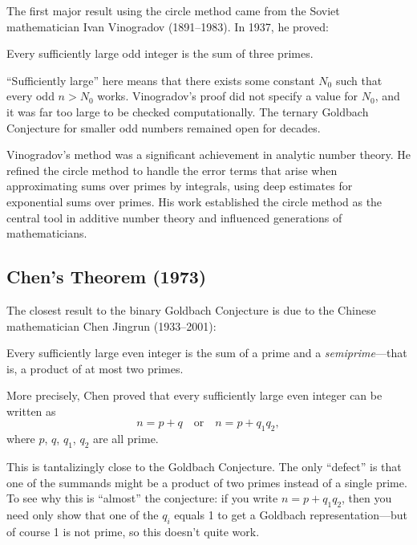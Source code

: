 The first major result using the circle method came from the Soviet mathematician Ivan Vinogradov (1891--1983). In 1937, he proved:

\begin{theorem}[Vinogradov, 1937]\label{thm:vinogradov}
Every sufficiently large odd integer is the sum of three primes.
\end{theorem}

``Sufficiently large'' here means that there exists some constant $N_0$ such that every odd $n > N_0$ works. Vinogradov's proof did not specify a value for $N_0$, and it was far too large to be checked computationally. The ternary Goldbach Conjecture for smaller odd numbers remained open for decades.

Vinogradov's method was a significant achievement in analytic number theory. He refined the circle method to handle the error terms that arise when approximating sums over primes by integrals, using deep estimates for exponential sums over primes. His work established the circle method as the central tool in additive number theory and influenced generations of mathematicians.

\subsection{Chen's Theorem (1973)}

The closest result to the binary Goldbach Conjecture is due to the Chinese mathematician Chen Jingrun (1933--2001):

\begin{theorem}[Chen, 1973]\label{thm:chen}
Every sufficiently large even integer is the sum of a prime and a \emph{semiprime}---that is, a product of at most two primes.
\end{theorem}

More precisely, Chen proved that every sufficiently large even integer can be written as
\[
    n = p + q \quad \text{or} \quad n = p + q_1 q_2,
\]
where $p$, $q$, $q_1$, $q_2$ are all prime.

This is tantalizingly close to the Goldbach Conjecture. The only ``defect'' is that one of the summands might be a product of two primes instead of a single prime. To see why this is ``almost'' the conjecture: if you write $n = p + q_1 q_2$, then you need only show that one of the $q_i$ equals 1 to get a Goldbach representation---but of course 1 is not prime, so this doesn't quite work.

